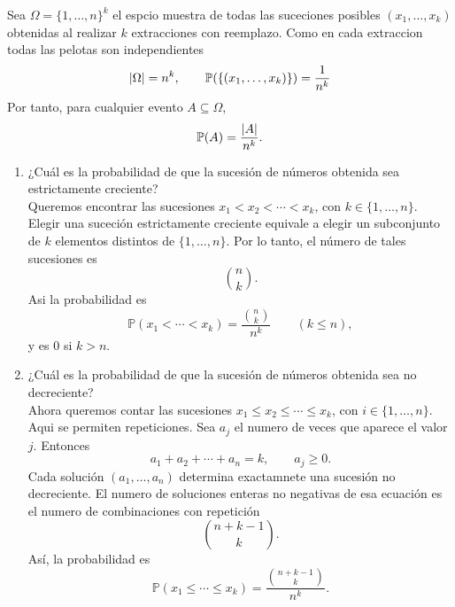 \documentclass[12pt,a4paper]{article}
\begin{document}
    \begin{solucion}
        Sea $\Omega=\{1,\dots,n\}^{k}$ el espcio muestra de todas las suceciones posibles
        $(x_{1},\dots,x_{k})$ obtenidas al realizar $k$ extracciones con reemplazo.
        Como en cada extraccion todas las pelotas son independientes
        \begin{align*}
            \abs{\Omega}=n^{k},\qquad \mathbb{P}(\{(x_{1},\dots,x_{k})\})=\frac{1}{n^{k}}
        \end{align*}
        Por tanto, para cualquier evento $A\subseteq\Omega$,
        \begin{equation*}
            \mathbb{P}(A)=\frac{\abs{A}}{n^{k}}.
        \end{equation*}
        \begin{enumerate}
            \item[(a)] ¿Cuál es la probabilidad de que la sucesión de números obtenida sea estrictamente creciente?\\
            Queremos encontrar las sucesiones $x_{1}\lt x_{2}\lt\cdots\lt x_{k}$, con $k\in\{1,\dots,n\}$.
            Elegir una suceción estrictamente creciente equivale a elegir un subconjunto de $k$ elementos
            distintos de $\{1,\dots,n\}$. Por lo tanto, el número de tales sucesiones es
            \begin{equation*}
                \binom{n}{k}.
            \end{equation*}
            Asi la probabilidad es
            \begin{equation*}
                \mathbb{P}(x_{1}\lt\cdots\lt x_{k})=\frac{\binom{n}{k}}{n^{k}} \qquad (k\leq n),
            \end{equation*}
            y es 0 si $k\gt n$.
            \item[(b)] ¿Cuál es la probabilidad de que la sucesión de números obtenida sea no decreciente?\\
            Ahora queremos contar las sucesiones $x_{1}\leq x_{2}\leq\cdots\leq x_{k}$, con $i\in\{1,\dots,n\}$.
            Aqui se permiten repeticiones.
            Sea $a_{j}$ el numero de veces que aparece el valor $j$. Entonces
            \begin{equation*}
                a_{1}+a_{2}+\cdots+a_{n}=k,\qquad a_{j}\geq0.
            \end{equation*}
            Cada solución $(a_{1},\dots,a_{n})$ determina exactamnete una sucesión no decreciente.
            El numero de soluciones enteras no negativas de esa ecuación es el numero de combinaciones con
            repetición
            \begin{equation*}
                \binom{n+k-1}{k}.
            \end{equation*}
            Así, la probabilidad es
            \begin{equation*}
                \mathbb{P}(x_{1}\leq\cdots\leq x_{k})=\frac{\binom{n+k-1}{k}}{n^{k}}.
            \end{equation*}
        \end{enumerate}
    \end{solucion}
    
\end{document}
